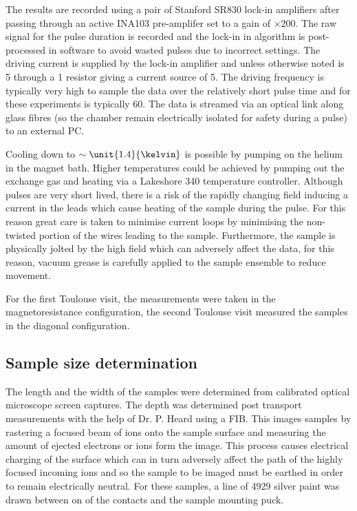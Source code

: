 The results are recorded using a pair of Stanford SR830 lock-in amplifiers after passing through an active INA103 pre-amplifer set to a gain of $\times200$. The raw signal for the pulse duration is recorded and the lock-in in algorithm is post-processed in software to avoid wasted pulses due to incorrect settings. The driving current is supplied by the lock-in amplifier and unless otherwise noted is \unit{5}{\volt} through a \unit{1}{\kilo\ohm} resistor giving a current source of \unit{5}{\milli\ampere}. The driving frequency is typically very high to sample the data over the relatively short pulse time and for these experiments is typically \unit{60}{\kilo\hertz}. The data is streamed via an optical link along glass fibres (so the chamber remain electrically isolated for safety during a pulse) to an external PC.

Cooling down to $\sim \unit{1.4}{\kelvin}$ is possible by pumping on the helium in the magnet bath. Higher temperatures could be achieved by pumping out the exchange gas and heating via a Lakeshore 340 temperature controller. Although pulses are very short lived, there is a risk of the rapidly changing field inducing a current in the leads which cause heating of the sample during the pulse. For this reason great care is taken to minimise current loops by minimising the non-twisted portion of the wires leading to the sample. Furthermore, the sample is physically jolted by the high field which can adversely affect the data, for this reason, vacuum grease is carefully applied to the sample ensemble to reduce movement.

For the first Toulouse visit, the measurements were taken in the magnetoresistance configuration, the second Toulouse visit measured the samples in the diagonal configuration.

\subsection{Sample size determination}

The length and the width of the samples were determined from calibrated optical microscope screen captures. The depth was determined post transport measurements with the help of Dr. P. Heard using a \ac{FIB}. This images samples by rastering a focused beam of ions onto the sample surface and measuring the amount of ejected electrons or ions form the image. This process causes electrical charging of the surface which can in turn adversely affect the path of the highly focused incoming ions and so the sample to be imaged must be earthed in order to remain electrically neutral. For these samples, a line of 4929 silver paint was drawn between on of the contacts and the sample mounting puck.

